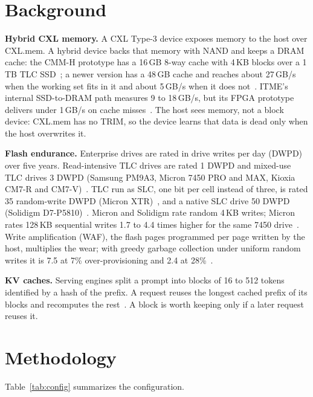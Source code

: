 \documentclass[acmsmall,screen,review]{acmart}
\begin{document}
\section{Background}
\label{sec:bg}
\textbf{Hybrid CXL memory.} A CXL Type-3 device exposes memory to the host over CXL.mem. A hybrid
device backs that memory with NAND and keeps a DRAM cache: the CMM-H prototype has a 16\,GB
8-way cache with 4\,KB blocks over a 1\,TB TLC SSD~\cite{cmmh}; a newer version has a 48\,GB cache
and reaches about 27\,GB/s when the working set fits in it and about 5\,GB/s when it does
not~\cite{cmmh_hs}. ITME's internal SSD-to-DRAM path measures 9 to 18\,GB/s, but its
FPGA prototype delivers under 1\,GB/s on cache misses~\cite{itme}. The host sees memory, not a block device:
CXL.mem has no TRIM, so the device learns that data is dead only when the host overwrites it.

\textbf{Flash endurance.} Enterprise drives are rated in drive writes per day (DWPD) over five
years. Read-intensive TLC drives are rated 1 DWPD and mixed-use TLC drives 3 DWPD (Samsung PM9A3,
Micron 7450 PRO and MAX, Kioxia CM7-R and CM7-V)~\cite{ds_samsung,ds_micron7450,ds_kioxia}. TLC run
as SLC, one bit per cell instead of three, is rated 35 random-write DWPD (Micron
XTR)~\cite{ds_micronxtr}, and a native SLC drive 50 DWPD (Solidigm D7-P5810)~\cite{ds_solidigm}.
Micron and Solidigm rate random 4\,KB writes; Micron rates 128\,KB sequential writes 1.7 to 4.4
times higher for the same 7450 drive~\cite{ds_micron7450}. Write amplification (WAF), the flash pages programmed per page written by the host,
multiplies the wear; with greedy garbage collection under uniform random writes it is 7.5 at
7\% over-provisioning and 2.4 at 28\%~\cite{desnoyers,vanhoudt}.

\textbf{KV caches.} Serving engines split a prompt into blocks of 16 to 512 tokens identified by a
hash of the prefix. A request reuses the longest cached prefix of its blocks and recomputes the
rest~\cite{vllm,mooncake}. A block is worth keeping only if a later request reuses it.

\section{Methodology}
\label{sec:method}
Table~\ref{tab:config} summarizes the configuration.
\end{document}
